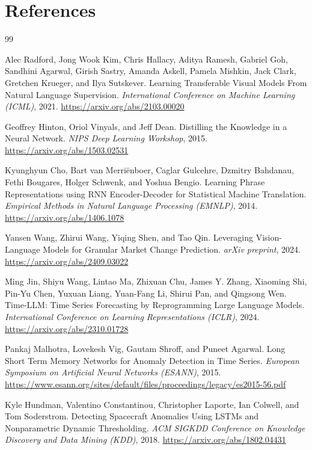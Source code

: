 \documentclass[10pt,twocolumn]{article}
\begin{document}
\section*{References}
\begin{thebibliography}{99}

Alec Radford, Jong Wook Kim, Chris Hallacy, Aditya Ramesh, Gabriel Goh, Sandhini Agarwal, Girish Sastry, Amanda Askell, Pamela Mishkin, Jack Clark, Gretchen Krueger, and Ilya Sutskever.
Learning Transferable Visual Models From Natural Language Supervision.
\textit{International Conference on Machine Learning (ICML)}, 2021.
\url{https://arxiv.org/abs/2103.00020}

Geoffrey Hinton, Oriol Vinyals, and Jeff Dean.
Distilling the Knowledge in a Neural Network.
\textit{NIPS Deep Learning Workshop}, 2015.
\url{https://arxiv.org/abs/1503.02531}

Kyunghyun Cho, Bart van Merriënboer, Caglar Gulcehre, Dzmitry Bahdanau, Fethi Bougares, Holger Schwenk, and Yoshua Bengio.
Learning Phrase Representations using RNN Encoder-Decoder for Statistical Machine Translation.
\textit{Empirical Methods in Natural Language Processing (EMNLP)}, 2014.
\url{https://arxiv.org/abs/1406.1078}

Yansen Wang, Zhirui Wang, Yiqing Shen, and Tao Qin.
Leveraging Vision-Language Models for Granular Market Change Prediction.
\textit{arXiv preprint}, 2024.
\url{https://arxiv.org/abs/2409.03022}

Ming Jin, Shiyu Wang, Lintao Ma, Zhixuan Chu, James Y. Zhang, Xiaoming Shi, Pin-Yu Chen, Yuxuan Liang, Yuan-Fang Li, Shirui Pan, and Qingsong Wen.
Time-LLM: Time Series Forecasting by Reprogramming Large Language Models.
\textit{International Conference on Learning Representations (ICLR)}, 2024.
\url{https://arxiv.org/abs/2310.01728}

Pankaj Malhotra, Lovekesh Vig, Gautam Shroff, and Puneet Agarwal.
Long Short Term Memory Networks for Anomaly Detection in Time Series.
\textit{European Symposium on Artificial Neural Networks (ESANN)}, 2015.
\url{https://www.esann.org/sites/default/files/proceedings/legacy/es2015-56.pdf}

Kyle Hundman, Valentino Constantinou, Christopher Laporte, Ian Colwell, and Tom Soderstrom.
Detecting Spacecraft Anomalies Using LSTMs and Nonparametric Dynamic Thresholding.
\textit{ACM SIGKDD Conference on Knowledge Discovery and Data Mining (KDD)}, 2018.
\url{https://arxiv.org/abs/1802.04431}


\end{thebibliography}
\end{document}
